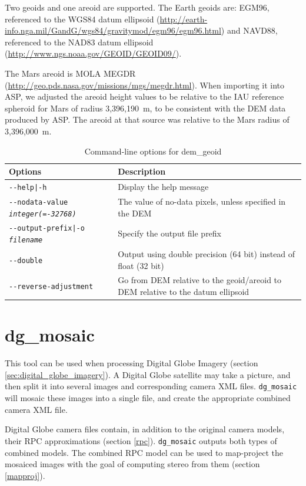 Two geoids and one areoid are supported. The Earth geoids are: EGM96, referenced to the WGS84 datum ellipsoid (\url{http://earth-info.nga.mil/GandG/wgs84/gravitymod/egm96/egm96.html})
and NAVD88, referenced to the NAD83 datum ellipsoid (\url{http://www.ngs.noaa.gov/GEOID/GEOID09/}).

The Mars areoid is MOLA MEGDR
(\url{http://geo.pds.nasa.gov/missions/mgs/megdr.html}). When importing
it into ASP, we adjusted the areoid height values to be relative to
the IAU reference spheroid for Mars of radius 3,396,190~m, to be
consistent with the DEM data produced by ASP. The areoid at that source was
relative to the Mars radius of 3,396,000~m.

\begin{longtable}{|l|p{10cm}|}
\caption{Command-line options for dem\_geoid}
\label{tbl:demgeoid}
\endfirsthead
\endhead
\endfoot
\endlastfoot
\hline
Options & Description \\ \hline \hline
\texttt{-\/-help|-h} & Display the help message\\ \hline
\texttt{-\/-nodata-value \textit{integer(=-32768)}} & The value of no-data pixels, unless specified in the DEM \\ \hline
\texttt{-\/-output-prefix|-o \textit{filename}} & Specify the output file prefix \\ \hline
\texttt{-\/-double} & Output using double precision (64 bit) instead of float (32 bit)\\ \hline
\texttt{-\/-reverse-adjustment} & Go from DEM relative to the geoid/areoid to DEM relative to the datum ellipsoid\\ \hline
\end{longtable}

\section{dg\_mosaic}
\label{dgmosaic}

This tool can be used when processing Digital Globe Imagery (section
\ref{sec:digital_globe_imagery}). A Digital Globe satellite may take a
picture, and then split it into several images and corresponding camera XML
files. \texttt{dg\_mosaic} will mosaic these images into a single file,
and create the appropriate combined camera XML file.

Digital Globe camera files contain, in addition to the original camera models, their RPC approximations
(section \ref{rpc}). \texttt{dg\_mosaic} outputs both types of combined models. The combined RPC model can be used to map-project the mosaiced images with the goal of computing stereo from them (section \ref{mapproj}).


